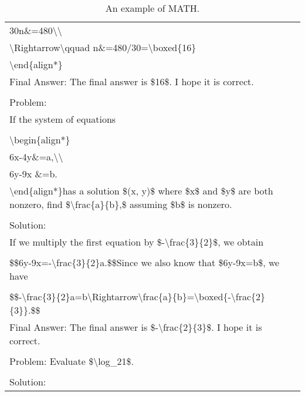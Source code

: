 \begin{table}[ht]
\begin{tabular}{p{12cm}}
\\30n\&=480\textbackslash \textbackslash 
\\\textbackslash Rightarrow\textbackslash qquad n\&=480/30=\textbackslash boxed\{16\}
\\\textbackslash end\{align*\}
\\Final Answer: The final answer is \$16\$. I hope it is correct.
\\
\\Problem:
\\If the system of equations
\\
\\\textbackslash begin\{align*\}
\\6x-4y\&=a,\textbackslash \textbackslash 
\\6y-9x \&=b.
\\\textbackslash end\{align*\}has a solution \$(x, y)\$ where \$x\$ and \$y\$ are both nonzero, find \$\textbackslash frac\{a\}\{b\},\$ assuming \$b\$ is nonzero.
\\
\\Solution:
\\If we multiply the first equation by \$-\textbackslash frac\{3\}\{2\}\$, we obtain
\\
\\\$\$6y-9x=-\textbackslash frac\{3\}\{2\}a.\$\$Since we also know that \$6y-9x=b\$, we have
\\
\\\$\$-\textbackslash frac\{3\}\{2\}a=b\textbackslash Rightarrow\textbackslash frac\{a\}\{b\}=\textbackslash boxed\{-\textbackslash frac\{2\}\{3\}\}.\$\$
\\Final Answer: The final answer is \$-\textbackslash frac\{2\}\{3\}\$. I hope it is correct.\\
\\
Problem: Evaluate \$\textbackslash log\_21\$.\\
\\
Solution:\\
\bottomrule
\end{tabular}
    \caption{\centering An example of MATH.}
    \label{tab:math_eval_format_example}
\end{table}


